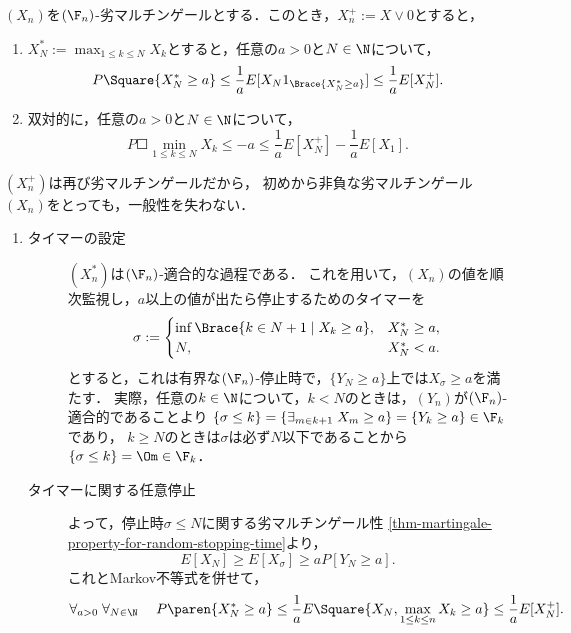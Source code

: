\documentclass[uplatex,dvipdfmx]{jsreport}
\begin{document}
\begin{theorem}\label{thm-Doob-inequality}
    $(X_n)$を$(\F_n)$-劣マルチンゲールとする．このとき，$X_n^+:=X\lor0$とすると，
    \begin{enumerate}
        \item $X^*_N:=\max_{1\le k\le N}X_k$とすると，任意の$a>0$と$N\in\N$について，
        \[P\Square{X^*_N\ge a}\le\frac{1}{a}E[X_N1_{\Brace{X^*_N\ge a}}]\le\frac{1}{a}E[X_N^+].\]
        \item 双対的に，任意の$a>0$と$N\in\N$について，
        \[P\Square{\min_{1\le k\le N}X_k\le -a}\le\frac{1}{a}E[X_N^+]-\frac{1}{a}E[X_1].\]
    \end{enumerate}
\end{theorem}
\begin{Proof}
    $(X^+_n)$は再び劣マルチンゲールだから，
    初めから非負な劣マルチンゲール$(X_n)$をとっても，一般性を失わない．
    \begin{enumerate}
        \item 
        \begin{description}
            \item[タイマーの設定] $(X^*_n)$は$(\F_n)$-適合的な過程である．
            これを用いて，$(X_n)$の値を順次監視し，$a$以上の値が出たら停止するためのタイマーを
            \[\sigma:=\begin{cases}
                \inf\Brace{k\in N+1\mid X_k\ge a},&X^*_N\ge a,\\
                N,&X^*_N<a.
            \end{cases}\]
            とすると，これは有界な$(\F_n)$-停止時で，$\{Y_N\ge a\}$上では$X_\sigma\ge a$を満たす．
            実際，任意の$k\in\N$について，$k<N$のときは，$(Y_n)$が$(\F_n)$-適合的であることより
            $\{\sigma\le k\}=\{\exists_{m\in k+1}\;X_m\ge a\}=\{Y_k\ge a\}\in\F_k$であり，
            $k\ge N$のときは$\sigma$は必ず$N$以下であることから$\{\sigma\le k\}=\Om\in\F_k$．
            \item[タイマーに関する任意停止] よって，停止時$\sigma\le N$に関する劣マルチンゲール性
            \ref{thm-martingale-property-for-random-stopping-time}より，
            \[E[X_N]\ge E[X_\sigma]\ge aP[Y_N\ge a].\]
            これとMarkov不等式を併せて，
            \[\forall_{a>0}\;\forall_{N\in\N}\;\quad P\paren{X^*_N\ge a}\le\frac{1}{a}E\Square{X_N,\max_{1\le k\le n}X_k\ge a}\le\frac{1}{a}E[X_N^+].\]
        \end{description}
    \end{enumerate}
\end{Proof}
\end{document}
